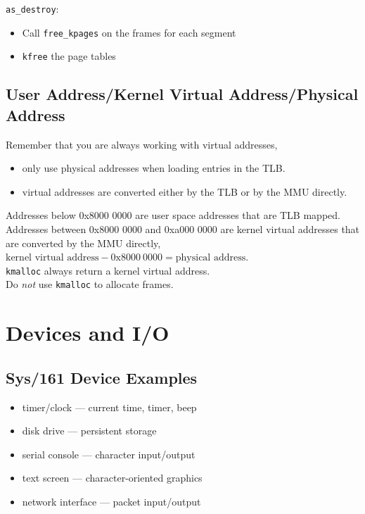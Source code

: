 \documentclass[12pt]{article}
\theoremstyle{plain}
\theoremstyle{definition}
\begin{document}
\texttt{as\_destroy}:
\begin{itemize}
  \item Call \texttt{free\_kpages} on the frames for each segment
  \item \texttt{kfree} the page tables
\end{itemize}

\subsection{User Address/Kernel Virtual Address/Physical Address}
Remember that you are always working with virtual addresses,
\begin{itemize}
  \item only use physical addresses when loading entries in the TLB.
  \item virtual addresses are converted either by the TLB or by the MMU directly.
\end{itemize}

Addresses below 0x8000 0000 are user space addresses that are TLB mapped. \\

Addresses between 0x8000 0000 and 0xa000 0000 are kernel virtual addresses that are converted by the MMU directly, $\text{kernel virtual address} - 0\text{x}8000~0000 = \text{physical address}$. \\

\texttt{kmalloc} always return a kernel virtual address. \\
Do \emph{not} use \texttt{kmalloc} to allocate frames.

\newpage
\section{Devices and I/O}
\subsection{Sys/161 Device Examples}
\begin{itemize}
  \item timer/clock --- current time, timer, beep
  \item disk drive --- persistent storage
  \item serial console --- character input/output
  \item text screen --- character-oriented graphics
  \item network interface --- packet input/output
\end{itemize}
\end{document}
